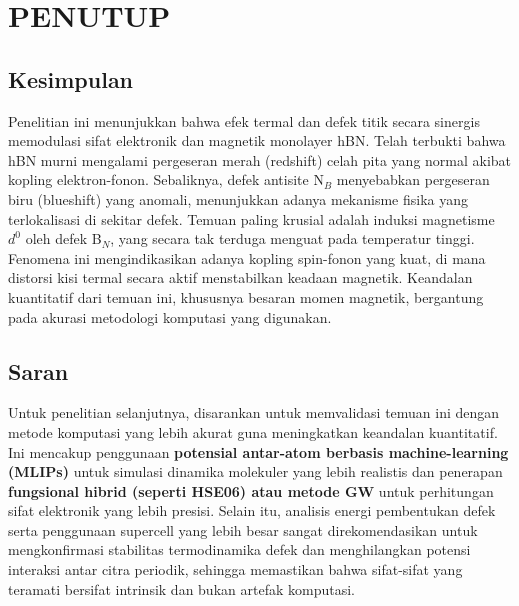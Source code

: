 \renewcommand{\thechapter}{\Roman{chapter}}
\chapter{PENUTUP}
\renewcommand{\thechapter}{\arabic{chapter}}

\section{Kesimpulan}
\label{sec:kesimpulan}
Penelitian ini menunjukkan bahwa efek termal dan defek titik secara sinergis memodulasi sifat elektronik dan magnetik monolayer hBN. Telah terbukti bahwa hBN murni mengalami pergeseran merah (redshift) celah pita yang normal akibat kopling elektron-fonon. Sebaliknya, defek antisite N$_B$ menyebabkan pergeseran biru (blueshift) yang anomali, menunjukkan adanya mekanisme fisika yang terlokalisasi di sekitar defek. Temuan paling krusial adalah induksi magnetisme $d^0$ oleh defek B$_N$, yang secara tak terduga menguat pada temperatur tinggi. Fenomena ini mengindikasikan adanya kopling spin-fonon yang kuat, di mana distorsi kisi termal secara aktif menstabilkan keadaan magnetik. Keandalan kuantitatif dari temuan ini, khususnya besaran momen magnetik, bergantung pada akurasi metodologi komputasi yang digunakan.

\section{Saran}
\label{sec:saran}
Untuk penelitian selanjutnya, disarankan untuk memvalidasi temuan ini dengan metode komputasi yang lebih akurat guna meningkatkan keandalan kuantitatif. Ini mencakup penggunaan \textbf{potensial antar-atom berbasis machine-learning (MLIPs)} untuk simulasi dinamika molekuler yang lebih realistis dan penerapan \textbf{fungsional hibrid (seperti HSE06) atau metode GW} untuk perhitungan sifat elektronik yang lebih presisi. Selain itu, analisis energi pembentukan defek serta penggunaan supercell yang lebih besar sangat direkomendasikan untuk mengkonfirmasi stabilitas termodinamika defek dan menghilangkan potensi interaksi antar citra periodik, sehingga memastikan bahwa sifat-sifat yang teramati bersifat intrinsik dan bukan artefak komputasi.